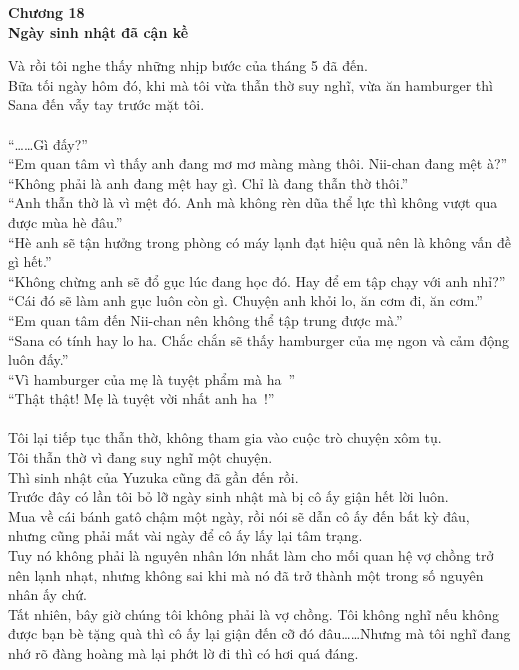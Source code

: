 \documentclass[12pt,a4paper, twosides]{book}
\begin{document}
    \begin{center}
    \textbf{\large Chương 18 \\ Ngày sinh nhật đã cận kề}
    \end{center}
    \noindent
Và rồi tôi nghe thấy những nhịp bước của tháng 5 đã đến.\\
Bữa tối ngày hôm đó, khi mà tôi vừa thẫn thờ suy nghĩ, vừa ăn hamburger thì Sana đến vẫy tay trước mặt tôi.\\
\\
“……Gì đấy?”\\
“Em quan tâm vì thấy anh đang mơ mơ màng màng thôi. Nii-chan đang mệt à?”\\
“Không phải là anh đang mệt hay gì. Chỉ là đang thẫn thờ thôi.”\\
“Anh thẫn thờ là vì mệt đó. Anh mà không rèn dũa thể lực thì không vượt qua được mùa hè đâu.”\\
“Hè anh sẽ tận hưởng trong phòng có máy lạnh đạt hiệu quả nên là không vấn đề gì hết.”\\
“Không chừng anh sẽ đổ gục lúc đang học đó. Hay để em tập chạy với anh nhỉ?”\\
“Cái đó sẽ làm anh gục luôn còn gì. Chuyện anh khỏi lo, ăn cơm đi, ăn cơm.”\\
“Em quan tâm đến Nii-chan nên không thể tập trung được mà.”\\
“Sana có tính hay lo ha. Chắc chắn sẽ thấy hamburger của mẹ ngon và cảm động luôn đấy.”\\
“Vì hamburger của mẹ là tuyệt phẩm mà ha~”\\
“Thật thật! Mẹ là tuyệt vời nhất anh ha~!”\\
\\
Tôi lại tiếp tục thẫn thờ, không tham gia vào cuộc trò chuyện xôm tụ.\\
Tôi thẫn thờ vì đang suy nghĩ một chuyện.\\
Thì sinh nhật của Yuzuka cũng đã gần đến rồi.\\
Trước đây có lần tôi bỏ lỡ ngày sinh nhật mà bị cô ấy giận hết lời luôn.\\
Mua về cái bánh gatô chậm một ngày, rồi nói sẽ dẫn cô ấy đến bất kỳ đâu, nhưng cũng phải mất vài ngày để cô ấy lấy lại tâm trạng.\\
Tuy nó không phải là nguyên nhân lớn nhất làm cho mối quan hệ vợ chồng trở nên lạnh nhạt, nhưng không sai khi mà nó đã trở thành một trong số nguyên nhân ấy chứ.\\
Tất nhiên, bây giờ chúng tôi không phải là vợ chồng. Tôi không nghĩ nếu không được bạn bè tặng quà thì cô ấy lại giận đến cỡ đó đâu……Nhưng mà tôi nghĩ đang nhớ rõ đàng hoàng mà lại phớt lờ đi thì có hơi quá đáng.\\
\end{document}
